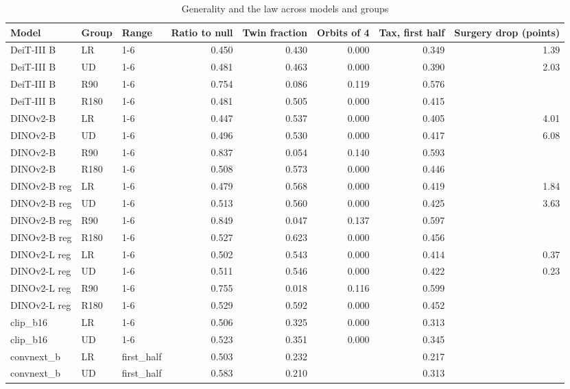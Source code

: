 \begin{table}[t]
\centering
\small
\caption{Generality and the law across models and groups}
\label{tab:table4_generality}
\begin{tabular}{lllrrrrr}
\toprule
Model & Group & Range & Ratio to null & Twin fraction & Orbits of 4 & Tax, first half & Surgery drop (points) \\
\midrule
DeiT-III B & LR & 1-6 & 0.450 & 0.430 & 0.000 & 0.349 & 1.39 \\
DeiT-III B & UD & 1-6 & 0.481 & 0.463 & 0.000 & 0.390 & 2.03 \\
DeiT-III B & R90 & 1-6 & 0.754 & 0.086 & 0.119 & 0.576 &  \\
DeiT-III B & R180 & 1-6 & 0.481 & 0.505 & 0.000 & 0.415 &  \\
DINOv2-B & LR & 1-6 & 0.447 & 0.537 & 0.000 & 0.405 & 4.01 \\
DINOv2-B & UD & 1-6 & 0.496 & 0.530 & 0.000 & 0.417 & 6.08 \\
DINOv2-B & R90 & 1-6 & 0.837 & 0.054 & 0.140 & 0.593 &  \\
DINOv2-B & R180 & 1-6 & 0.508 & 0.573 & 0.000 & 0.446 &  \\
DINOv2-B reg & LR & 1-6 & 0.479 & 0.568 & 0.000 & 0.419 & 1.84 \\
DINOv2-B reg & UD & 1-6 & 0.513 & 0.560 & 0.000 & 0.425 & 3.63 \\
DINOv2-B reg & R90 & 1-6 & 0.849 & 0.047 & 0.137 & 0.597 &  \\
DINOv2-B reg & R180 & 1-6 & 0.527 & 0.623 & 0.000 & 0.456 &  \\
DINOv2-L reg & LR & 1-6 & 0.502 & 0.543 & 0.000 & 0.414 & 0.37 \\
DINOv2-L reg & UD & 1-6 & 0.511 & 0.546 & 0.000 & 0.422 & 0.23 \\
DINOv2-L reg & R90 & 1-6 & 0.755 & 0.018 & 0.116 & 0.599 &  \\
DINOv2-L reg & R180 & 1-6 & 0.529 & 0.592 & 0.000 & 0.452 &  \\
clip\_b16 & LR & 1-6 & 0.506 & 0.325 & 0.000 & 0.313 &  \\
clip\_b16 & UD & 1-6 & 0.523 & 0.351 & 0.000 & 0.345 &  \\
convnext\_b & LR & first\_half & 0.503 & 0.232 &  & 0.217 &  \\
convnext\_b & UD & first\_half & 0.583 & 0.210 &  & 0.313 &  \\

\end{tabular}
\end{table}
